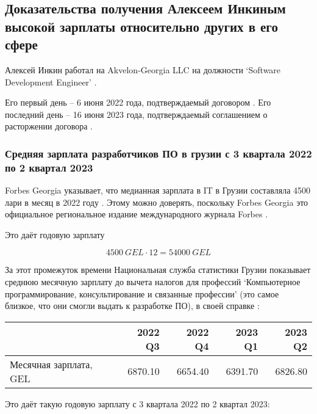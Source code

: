 \subsection{%
    Доказательства получения Алексеем Инкиным высокой зарплаты относительно других в его сфере%
}
\label{subsec:Salary}

Алексей Инкин работал на Akvelon-Georgia LLC на должности `Software Development Engineer'
.

Его первый день -- 6 июня 2022 года, подтверждаемый договором .
Его последний день -- 16 июня 2023 года, подтверждаемый соглашением о расторжении договора .


\subsubsection{Средняя зарплата разработчиков ПО в грузии с 3 квартала 2022 по 2 квартал 2023}



Forbes Georgia указывает, что медианная зарплата в IT в Грузии составляла 4500 лари в месяц в 2022 году
.
Этому можно доверять, поскольку Forbes Georgia это официальное региональное издание
международного журнала Forbes .

Это даёт годовую зарплату

\[
    4500\:GEL \cdot 12 = 54000\:GEL
\]


За этот промежуток времени Национальная служба статистики Грузии
показывает среднюю месячную зарплату до вычета налогов для профессий
`Компьютерное программирование, консультирование и связанные профессии'
(это самое близкое, что они смогли выдать к разработке ПО),
в своей справке :

\begin{center}
    \begin{tabular}{|l|r|r|r|r|}
        \hline
        & 2022 Q3 & 2022 Q4 & 2023 Q1 & 2023 Q2 \\
        \hline
        Месячная зарплата, GEL & 6870.10 & 6654.40 & 6391.70 & 6826.80 \\
        \hline
    \end{tabular}
\end{center}

Это даёт такую годовую зарплату с 3 квартала 2022 по 2 квартал 2023:

